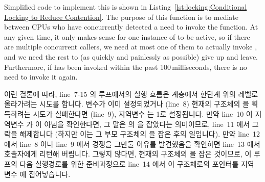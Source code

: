 Simplified code to implement this is shown in
Listing~\ref{lst:locking:Conditional Locking to Reduce Contention}.
The purpose of this function is to mediate between CPUs who have concurrently
detected a need to invoke the  function.
At any given time, it only makes sense for one instance of
 to be active, so if there are multiple
concurrent callers, we need at most one of them to actually invoke
, and we need the rest to (as quickly and
painlessly as possible) give up and leave.
Furthermore, if  has been invoked within
the past 100\,milliseconds, there is no need to invoke it again.
\fi

이런 결론에 따라, line~7-15 의 루프에서의 실행 흐름은  계층에서
한단계 위의 레벨로 올라가려는 시도를 합니다.
 변수가 이미 설정되었거나 (line~8) 현재의  구조체의
 을 획득하려는 시도가 실패한다면 (line~9), 지역변수  는
1로 설정됩니다.
만약 line~10 이 지역변수  가  이 아님을 확인한다면, 그
말은  의  을 잡았다는 의미이므로, line~11 에서 그
락을 해제합니다 (하지만 이는 그 부모  구조체의  을
잡은 후의 일입니다).
만약 line~12 에서 line~8 이나 line~9 에서 경쟁을 그만둘 이유를 발견했음을
확인하면 line~13 에서 호출자에게 리턴해 버립니다.
그렇지 않다면, 현재의  구조체의  을 잡은 것이므로,
이 루프의 다음 실행경로를 위한 준비과정으로 line~14 에서 이 구조체로의 포인터를
지역 변수  에 집어넣습니다.

